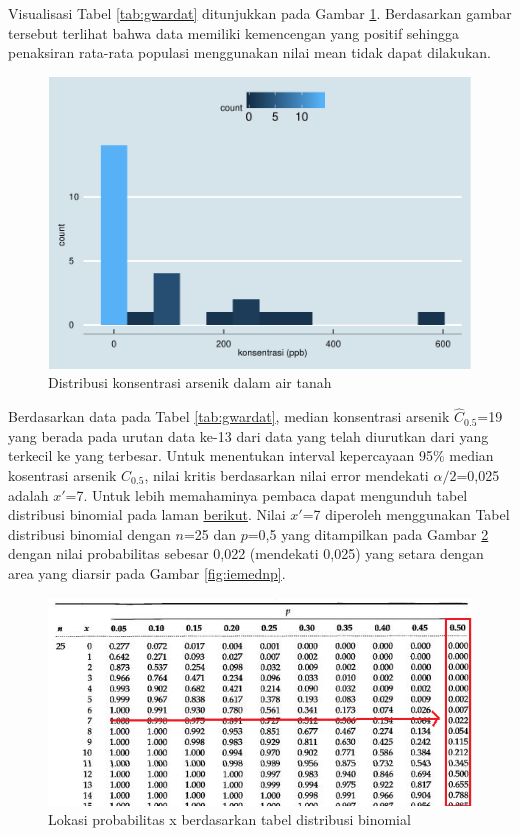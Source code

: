 \documentclass[]{book}
\begin{document}
Visualisasi Tabel \ref{tab:gwardat} ditunjukkan pada Gambar
\ref{fig:gwardatvis}. Berdasarkan gambar tersebut terlihat bahwa data
memiliki kemencengan yang positif sehingga penaksiran rata-rata populasi
menggunakan nilai mean tidak dapat dilakukan.

\begin{figure}

{\centering \includegraphics[width=0.7\linewidth]{EnvStat_files/figure-latex/gwardatvis-1} 

}

\caption{Distribusi konsentrasi arsenik dalam air tanah}\label{fig:gwardatvis}
\end{figure}

Berdasarkan data pada Tabel \ref{tab:gwardat}, median konsentrasi
arsenik \(\hat{C}_{0.5}\)=19 yang berada pada urutan data ke-13 dari
data yang telah diurutkan dari yang terkecil ke yang terbesar. Untuk
menentukan interval kepercayaan 95\% median kosentrasi arsenik
\(C_{0.5}\), nilai kritis berdasarkan nilai error mendekati
\(\alpha/2\)=0,025 adalah \(x'\)=7. Untuk lebih memahaminya pembaca
dapat mengunduh tabel distribusi binomial pada laman
\href{https://onlinepubs.trb.org/onlinepubs/nchrp/cd-22/manual/v2appendixc.pdf}{berikut}.
Nilai \(x'\)=7 diperoleh menggunakan Tabel distribusi binomial dengan
\(n\)=25 dan \(p\)=0,5 yang ditampilkan pada Gambar \ref{fig:tabbinom}
dengan nilai probabilitas sebesar 0,022 (mendekati 0,025) yang setara
dengan area yang diarsir pada Gambar \ref{fig:iemednp}.

\begin{figure}

{\centering \includegraphics[width=0.65\linewidth]{tabbinom} 

}

\caption{Lokasi probabilitas x berdasarkan tabel distribusi binomial}\label{fig:tabbinom}
\end{figure}
\end{document}
